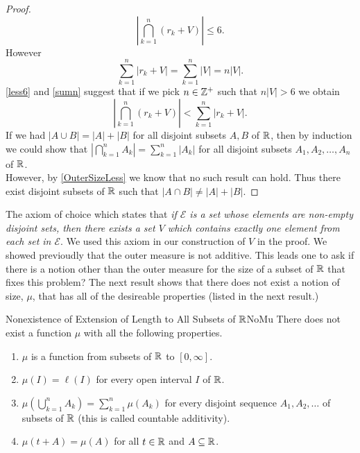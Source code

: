 \documentclass[twoside, openright, fontsize=10pt, headings=big]{scrbook}
\begin{document}
\begin{proof}
    \begin{equation}\label{less6}
        \left|\bigcap_{k=1}^{n}(r_k+V)\right|\leq6.
    \end{equation}
    However
    \begin{equation}\label{sumn}
        \sum_{k=1}^{n}|r_k+V|=\sum_{k=1}^{n}|V|=n|V|.
    \end{equation}
    \ref{less6} and \ref{sumn} suggest that if we pick $n\in\mathbb{Z}^+$ such that $n|V|>6$ we obtain
    \begin{equation}\label{OuterSizeLess}
        \left|\bigcap_{k=1}^{n}(r_k+V)\right|<\sum_{k=1}^{n}|r_k+V|.
    \end{equation}
    If we had $|A\cup B|=|A|+|B|$ for all disjoint subsets $A,B$ of $\mathbb{R}$, then by induction we could show that $\left|\bigcap_{k=1}^{n}A_k\right|=\sum_{k=1}^{n}|A_k|$ for all disjoint subsets $A_1,A_2,\dots,A_n$ of $\mathbb{R}$.\\
    However, by \ref{OuterSizeLess} we know that no such result can hold. Thus there exist disjoint subsets of $\mathbb{R}$ such that $|A\cap B|\neq|A|+|B|$.
\end{proof}
The axiom of choice which states that \textit{if $\mathcal{E}$ is a set whose elements are non-empty disjoint sets, then there exists a set $V$ which contains exactly one element from each set in $\mathcal{E}$}. We used this axiom in our construction of $V$ in the proof. 
We showed previoudly that the outer measure is not additive. This leads one to ask if there is a notion other than the outer measure for the size of a subset of $\mathbb{R}$ that fixes this problem? The next result shows that there does not exist a notion of size, $\mu$, that has all of the desireable properties (listed in the next result.)
\begin{theorem}{Nonexistence of Extension of Length to All Subsets of $\mathbb{R}$}{NoMu}
    There does not exist a function $\mu$ with all the following properties.
    \begin{enumerate}[label=(\alph*)]
        \item $\mu$ is a function from subsets of $\mathbb{R}$ to $[0,\infty]$.
        \item $\mu(I) =\ell(I)$ for every open interval $I$ of $\mathbb{R}$.
        \item $\mu\left(\bigcup_{k=1}^{n}A_k\right)=\sum_{k=1}^{n}\mu(A_k)$ for every disjoint sequence $A_1,A_2,\dots$ of subsets of $\mathbb{R}$ (this is called countable additivity).
        \item $\mu(t+A)=\mu(A)$ for all $t\in\mathbb{R}$ and $A\subseteq\mathbb{R}$.
    \end{enumerate}
\end{theorem}
\end{document}
